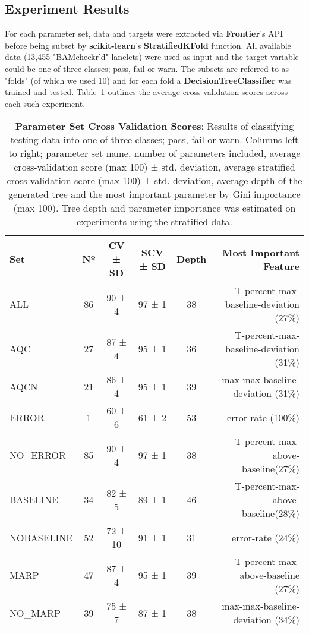 \subsection{Experiment Results}
For each parameter set, data and targets were extracted via \textbf{Frontier}'s
API before being subset by \textbf{scikit-learn}'s
\textbf{StratifiedKFold}\citep{sl:skf}
function. All available data (13,455 "BAMcheckr'd" lanelets) were used as input
and the target variable could be one of three classes; pass, fail or warn.
The subsets are referred to as "folds" (of which we used 10) and for
each fold a \textbf{DecisionTreeClassifier}\citep{sl:dtc} was trained and tested.
Table~\ref{tab:pset-cv} outlines the average cross validation scores across each
such experiment.

\begin{table}
    \centering
    \begin{tabular}{l | c  c  c  c  r}
        Set           & Nº & CV ± SD & SCV ± SD & Depth & Most Important Feature\\
        \hline
        ALL           & 86 & 90 ± 4 & 97 ± 1 & 38 & T-percent-max-baseline-deviation (27\%)\\
        AQC           & 27 & 87 ± 4 & 95 ± 1 & 36 & T-percent-max-baseline-deviation (31\%)\\
        AQCN          & 21 & 86 ± 4 & 95 ± 1 & 39 & max-max-baseline-deviation (31\%)\\
        ERROR         & 1  & 60 ± 6 & 61 ± 2 & 53 & error-rate (100\%)\\
        NO\_ERROR     & 85 & 90 ± 4 & 97 ± 1 & 38 & T-percent-max-above-baseline(27\%)\\
        BASELINE      & 34 & 82 ± 5 & 89 ± 1 & 46 & T-percent-max-above-baseline(28\%)\\
        NOBASELINE    & 52 & 72 ± 10 & 91 ± 1 & 31 & error-rate (24\%)\\
        MARP          & 47 & 87 ± 4 & 95 ± 1 & 39 & T-percent-max-above-baseline (27\%)\\
        NO\_MARP      & 39 & 75 ± 7 & 87 ± 1 & 38 & max-max-baseline-deviation (34\%)\\
    \end{tabular}

    \caption[pset-cv]{\textbf{Parameter Set Cross Validation Scores}: Results of
        classifying testing data into one of three classes; pass, fail or warn.
        Columns left to right; parameter set name, number of parameters
        included, average cross-validation score (max 100) ± std. deviation,
        average stratified cross-validation score (max 100) ± std. deviation,
        average depth of the generated tree and the most important parameter by
        Gini importance (max 100). Tree depth and parameter importance was
    estimated on experiments using the stratified data.}

    \label{tab:pset-cv}
\end{table}

